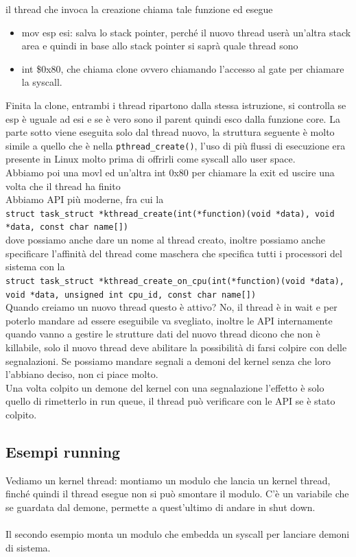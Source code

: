\documentclass[12pt, oneside]{extbook}
\begin{document}
il thread che invoca la creazione chiama tale funzione ed esegue 
\begin{itemize}
\item mov esp esi: salva lo stack pointer, perché il nuovo thread userà un'altra stack area e quindi in base allo stack pointer si saprà quale thread sono
\item int \$0x80, che chiama clone ovvero chiamando l'accesso al gate per chiamare la syscall.
\end{itemize}
Finita la clone, entrambi i thread ripartono dalla stessa istruzione, si controlla se esp è uguale ad esi e se è vero sono il parent quindi esco dalla funzione core. La parte sotto viene eseguita solo dal thread nuovo, la struttura seguente è molto simile a quello che è nella \texttt{pthread\_create()}, l'uso di più flussi di esecuzione era presente in Linux molto prima di offrirli come syscall allo user space.\\Abbiamo poi una movl ed un'altra int 0x80 per chiamare la exit ed uscire una volta che il thread ha finito\\Abbiamo API più moderne, fra cui la\\ 
\texttt{struct task\_struct *kthread\_create(int(*function)(void *data), void *data, const char name[])}\\
dove possiamo anche dare un nome al thread creato, inoltre possiamo anche specificare l'affinità del thread come maschera che specifica tutti i processori del sistema con la\\
\texttt{struct task\_struct *kthread\_create\_on\_cpu(int(*function)(void *data), void *data, unsigned int cpu\_id, const char name[])}
\\Quando creiamo un nuovo thread questo è attivo? No, il thread è in wait e per poterlo mandare ad essere eseguibile va svegliato, inoltre le API internamente quando vanno a gestire le strutture dati del nuovo thread dicono che non è killabile, solo il nuovo thread deve abilitare la possibilità di farsi colpire con delle segnalazioni. Se possiamo mandare segnali a demoni del kernel senza che loro l'abbiano deciso, non ci piace molto.\\Una volta colpito un demone del kernel con una segnalazione l'effetto è solo quello di rimetterlo in run queue, il thread può verificare con le API se è stato colpito.
\subsection{Esempi running}
Vediamo un kernel thread: montiamo un modulo che lancia un kernel thread, finché quindi il thread esegue non si può smontare il modulo. C'è un variabile che se guardata dal demone, permette a quest'ultimo di andare in shut down.\\\\Il secondo esempio monta un modulo che embedda un syscall per lanciare demoni di sistema.
\end{document}
